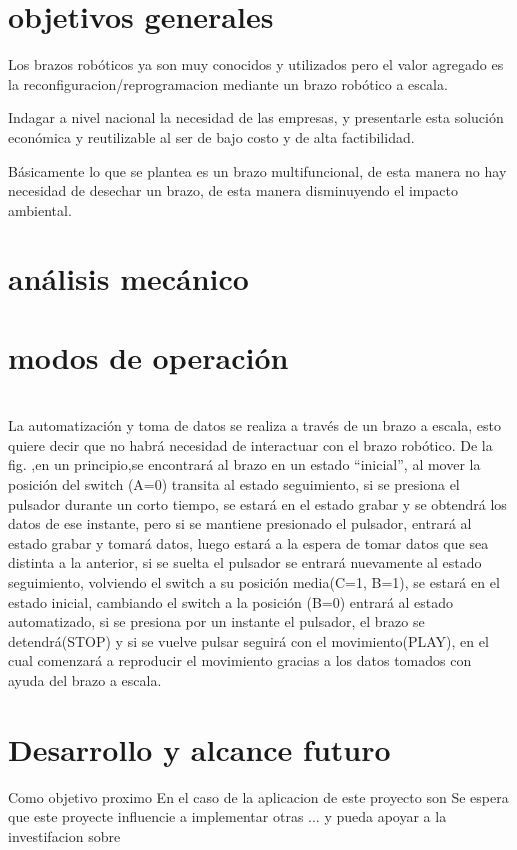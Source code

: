 \documentclass[conference]{IEEEtran}
\begin{document}
\section{objetivos generales}
Los brazos robóticos ya son muy conocidos y utilizados pero el
valor agregado es la reconfiguracion/reprogramacion mediante un
brazo robótico a escala.

Indagar a nivel nacional la necesidad de las empresas, y presentarle
esta solución económica y reutilizable al ser de bajo costo y de alta 
factibilidad.
   
Básicamente lo que se plantea es un brazo multifuncional, de esta manera
no hay necesidad de desechar un brazo, de esta manera disminuyendo el 
impacto ambiental.

\section{análisis mecánico}


\section{modos de operación}

   
\section*{}
La automatización y toma de datos se realiza a través de un brazo a
escala, esto quiere decir que no habrá necesidad de interactuar con
el brazo robótico.
De la fig. ,en un principio,se encontrará al brazo en un estado “inicial”, 
al mover la posición del switch (A=0) transita al estado seguimiento, si se 
presiona el pulsador durante un corto tiempo, se estará en el estado grabar 
y se obtendrá los datos de ese instante, pero si se mantiene presionado el 
pulsador, entrará al estado grabar y tomará datos, luego estará a la espera 
de tomar datos que sea distinta a la anterior, si se suelta el pulsador se 
entrará nuevamente al estado seguimiento, volviendo el switch a su posición 
media(C=1, B=1), se estará en el estado inicial, cambiando el switch a la 
posición (B=0) entrará al estado automatizado, si se presiona por un 
instante el pulsador, el brazo se detendrá(STOP) y si se vuelve pulsar 
seguirá con el movimiento(PLAY), en el cual comenzará a reproducir el 
movimiento gracias a los datos tomados con ayuda del brazo a escala.

\section{Desarrollo y alcance futuro}
Como objetivo proximo
En el caso de la aplicacion de este proyecto son 
Se espera que este proyecte influencie a implementar otras ... y pueda
apoyar a la investifacion sobre
\end{document}
